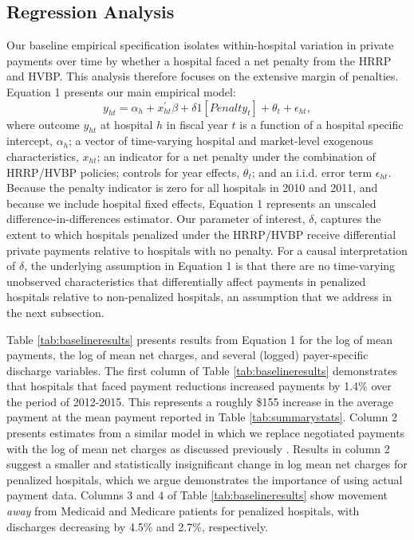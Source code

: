 \documentclass[12pt]{article}
\begin{document}
\subsection{Regression Analysis}
Our baseline empirical specification isolates within-hospital variation in private payments over time by whether a hospital faced a net penalty from the HRRP and HVBP. This analysis therefore focuses on the extensive margin of penalties.  Equation 1 presents our main empirical model:
\begin{equation}
\label{eq: reg}
y_{ht} = \alpha_{h} + x^{'}_{ht}\beta + \delta1[Penalty_{t}]  + \theta_{t}  +  \epsilon_{ht},
\end{equation}
where outcome $y_{ht}$ at hospital $h$ in fiscal year $t$ is a function of a hospital specific intercept, $\alpha_{h}$; a vector of time-varying hospital and market-level exogenous characteristics, $x_{ht}$; an indicator for a net penalty under the combination of HRRP/HVBP policies; controls for year effects, $\theta_t$; and an i.i.d. error term $\epsilon_{ht}$.  Because the penalty indicator is zero for all hospitals in 2010 and 2011, and because we include hospital fixed effects, Equation 1 represents an unscaled difference-in-differences estimator. Our parameter of interest, $\delta$, captures the extent to which hospitals penalized under the HRRP/HVBP receive differential private payments relative to hospitals with no penalty.  For a causal interpretation of $\delta$, the underlying assumption in Equation 1 is that there are no time-varying unobserved characteristics that differentially affect payments in penalized hospitals relative to non-penalized hospitals, an assumption that we address in the next subsection.

Table \ref{tab:baselineresults} presents results from Equation 1 for the log of mean payments, the log of mean net charges, and several (logged) payer-specific discharge variables. The first column of Table \ref{tab:baselineresults} demonstrates that hospitals that faced payment reductions increased payments by 1.4\% over the period of 2012-2015.  This represents a roughly \$155 increase in the average payment at the mean payment reported in Table \ref{tab:summarystats}.  Column 2 presents estimates from a similar model in which we replace negotiated payments with the log of mean net charges as discussed previously \citep{dafny2009,lewis2015,schmitt2017,dranove2017}. Results in column 2 suggest a smaller and statistically insignificant change in log mean net charges for penalized hospitals, which we argue demonstrates the importance of using actual payment data.  Columns 3 and 4 of Table \ref{tab:baselineresults} show movement \textit{away} from Medicaid and Medicare patients for penalized hospitals, with discharges decreasing by 4.5\% and 2.7\%, respectively.
\end{document}
